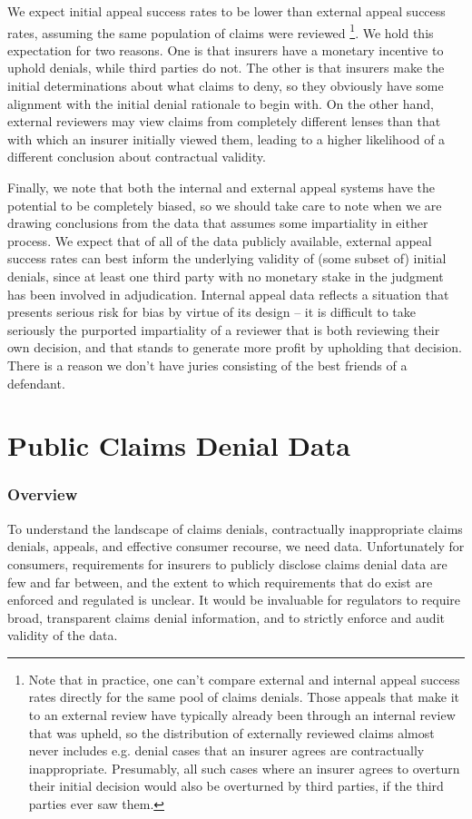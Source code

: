 \documentclass[12pt, a4paper,twoside,parskip=full]{report}
\theoremstyle{plain} %
\theoremstyle{definition} %
\theoremstyle{remark} %
\numberwithin{equation}{chapter}
\begin{document}
		We expect initial appeal success rates to be lower than external appeal success rates, assuming the same population of claims were reviewed \footnote{Note that in practice, one can't compare external and internal appeal success rates directly for the same pool of claims denials. Those appeals that make it to an external review have typically already been through an internal review that was upheld, so the distribution of externally reviewed claims almost never includes e.g. denial cases that an insurer agrees are contractually inappropriate. Presumably, all such cases where an insurer agrees to overturn their initial decision would also be overturned by third parties, if the third parties ever saw them.}. We hold this expectation for two reasons. One is that insurers have a monetary incentive to uphold denials, while third parties do not. The other is that insurers make the initial determinations about what claims to deny, so they obviously have some alignment with the initial denial rationale to begin with. On the other hand, external reviewers may view claims from completely different lenses than that with which an insurer initially viewed them, leading to a higher likelihood of a different conclusion about contractual validity.
		
		Finally, we note that both the internal and external appeal systems have the potential to be completely biased, so we should take care to note when we are drawing conclusions from the data that assumes some impartiality in either process. We expect that of all of the data publicly available, external appeal success rates can best inform the underlying validity of (some subset of) initial denials, since at least one third party with no monetary stake in the judgment has been involved in adjudication. Internal appeal data reflects a situation that presents serious risk for bias by virtue of its design -- it is difficult to take seriously the purported impartiality of a reviewer that is both reviewing their own decision, and that stands to generate more profit by upholding that decision. There is a reason we don't have juries consisting of the best friends of a defendant.
		
		\chapter{Public Claims Denial Data}\label{publicdata}
				
		\subsection{Overview}\label{publicdata:overview}
		To understand the landscape of claims denials, contractually inappropriate claims denials, appeals, and effective consumer recourse, we need data. Unfortunately for consumers, requirements for insurers to publicly disclose claims denial data are few and far between, and the extent to which requirements that do exist are enforced and regulated is unclear. It would be invaluable for regulators to require broad, transparent claims denial information, and to strictly enforce and audit validity of the data.
\end{document}
